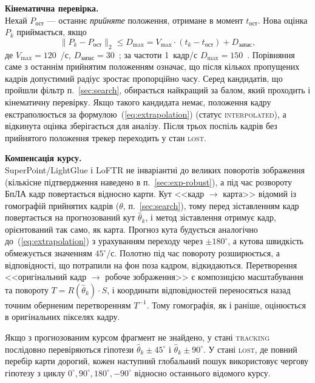 \documentclass[a4paper, 12pt, titlepage]{article}
\begin{document}
\textbf{Кінематична перевірка.}\\
Нехай $P_{\text{ост}}$ --- останнє \emph{прийняте} положення, отримане в момент $t_{\text{ост}}$. Нова оцінка $P_k$ приймається, якщо
\begin{equation}
\| P_k - P_{\text{ост}} \|_2 \le D_{\max} = V_{\max} \cdot (t_k - t_{\text{ост}}) + D_{\text{запас}},
\end{equation}
де $V_{\max} = 120$~\px{}/с, $D_{\text{запас}} = 30$~\px{}; за частоти 1~кадр/с $D_{\max} = 150$~\px{}. Порівняння саме з останнім прийнятим положенням означає, що після кількох пропущених кадрів допустимий радіус зростає пропорційно часу. Серед кандидатів, що пройшли фільтр п.~\ref{sec:search}, обирається найкращий за балом, який проходить і кінематичну перевірку. Якщо такого кандидата немає, положення кадру екстраполюється за формулою~(\ref{eq:extrapolation}) (статус \textsc{interpolated}), а відкинута оцінка зберігається для аналізу. Після трьох поспіль кадрів без прийнятого положення трекер переходить у стан \textsc{lost}.

\textbf{Компенсація курсу.}\\
SuperPoint/LightGlue і LoFTR не інваріантні до великих поворотів зображення (кількісне підтвердження наведено в п.~\ref{sec:exp-robust}), а під час розвороту БпЛА кадр повертається відносно карти. Кут <<кадр $\to$ карта>> відомий із гомографій прийнятих кадрів ($\theta$, п.~\ref{sec:search}), тому перед зіставленням кадр повертається на прогнозований кут $\hat{\theta}_k$, і метод зіставлення отримує кадр, орієнтований так само, як карта. Прогноз кута будується аналогічно до~(\ref{eq:extrapolation}) з урахуванням переходу через $\pm 180^\circ$, а кутова швидкість обмежується значенням $45^\circ$/с. Полотно під час повороту розширюється, а відповідності, що потрапили на фон поза кадром, відкидаються. Перетворення <<оригінальний кадр $\to$ робоче зображення>> є композицією масштабування та повороту $T = R(\hat{\theta}_k) \cdot S$, і координати відповідностей переносяться назад точним оберненим перетворенням $T^{-1}$. Тому гомографія, як і раніше, оцінюється в оригінальних пікселях кадру.

Якщо з прогнозованим курсом фрагмент не знайдено, у стані \textsc{tracking} послідовно перевіряються гіпотези $\hat{\theta}_k \pm 45^\circ$ і $\hat{\theta}_k \pm 90^\circ$. У стані \textsc{lost}, де повний перебір карти дорогий, кожен наступний глобальний пошук використовує чергову гіпотезу з циклу $0^\circ, 90^\circ, 180^\circ, -90^\circ$ відносно останнього відомого курсу.
\end{document}
